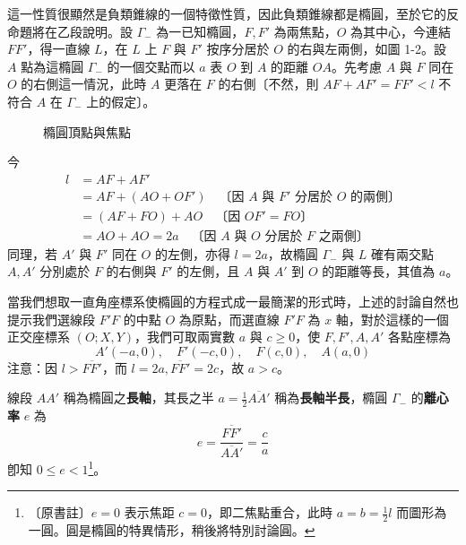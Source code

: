 這一性質很顯然是負類錐線的一個特徵性質，因此負類錐線都是橢圓，至於它的反命題將在乙段說明。設 $\Gamma_-$ 為一已知橢圓，$F, F'$ 為兩焦點，$O$ 為其中心，今連結 $FF'$，得一直線 $L$，在 $L$ 上 $F$ 與 $F'$ 按序分居於 $O$ 的右與左兩側，如圖 1-2。設 $A$ 點為這橢圓 $\Gamma_-$ 的一個交點而以 $a$ 表 $O$ 到 $A$ 的距離 $OA$。先考慮 $A$ 與 $F$ 同在 $O$ 的右側這一情況，此時 $A$ 更落在 $F$ 的右側〔不然，則 $AF + AF' = FF' < l$ 不符合 $A$ 在 $\Gamma_-$ 上的假定〕。

\begin{figure}[htbp]
\centering
{}
\caption{橢圓頂點與焦點}
\label{fig:b4s-3-2}
\end{figure}

今
\begin{align*}
l &= AF + AF' \\
  &= AF + (AO + OF') \quad \text{〔因 $A$ 與 $F'$ 分居於 $O$ 的兩側〕} \\
  &= (AF + FO) + AO \quad \text{〔因 $OF' = FO$〕} \\
  &= AO + AO = 2a \quad \text{〔因 $A$ 與 $O$ 分居於 $F$ 之兩側〕}
\end{align*}
同理，若 $A'$ 與 $F'$ 同在 $O$ 的左側，亦得 $l = 2a$，故橢圓 $\Gamma_-$ 與 $L$ 確有兩交點 $A, A'$ 分別處於 $F$ 的右側與 $F'$ 的左側，且 $A$ 與 $A'$ 到 $O$ 的距離等長，其值為 $a$。

當我們想取一直角座標系使橢圓的方程式成一最簡潔的形式時，上述的討論自然也提示我們選線段 $F'F$ 的中點 $O$ 為原點，而選直線 $F'F$ 為 $x$ 軸，對於這樣的一個正交座標系 $(O; X, Y)$，我們可取兩實數 $a$ 與 $c \ge 0$，使 $F, F', A, A'$ 各點座標為
\[ A'(-a,0), \quad F'(-c,0), \quad F(c,0), \quad A(a,0) \]
注意：因 $l > \overline{FF'}$，而 $l = 2a, \overline{FF'} = 2c$，故 $a > c$。

\begin{definition*}
線段 $AA'$ 稱為橢圓之\textbf{長軸}，其長之半 $a = \frac{1}{2}\overline{AA'}$ 稱為\textbf{長軸半長}，橢圓 $\Gamma_-$ 的\textbf{離心率} $e$ 為
\[ e = \frac{\overline{FF'}}{\overline{AA'}} = \frac{c}{a} \]
卽知 $0 \le e < 1$\label{note:b4s-ch3-e-circle}\footnote{〔原書註〕$e=0$ 表示焦距 $c=0$，即二焦點重合，此時 $a=b=\frac{1}{2}l$ 而圖形為一圓。圓是橢圓的特異情形，稍後將特別討論圓。}。
\end{definition*}

